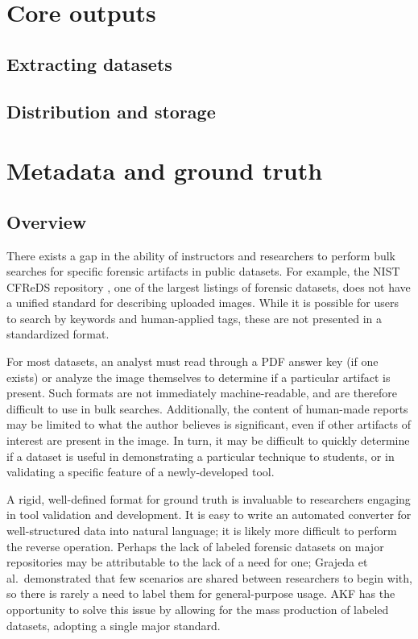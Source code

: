 \section{Core outputs}\label{core-outputs}

\subsection{Extracting datasets}\label{extracting-datasets}

\subsection{Distribution and
storage}\label{distribution-and-storage}

\section{Metadata and ground
truth}\label{metadata-and-ground-truth}

\subsection{Overview}\label{overview-1}

There exists a gap in the ability of instructors and researchers to
perform bulk searches for specific forensic artifacts in public
datasets. For example, the NIST CFReDS repository
\cite{nationalinstituteofstandardsandtechnologyCFReDSPortal}, one of
the largest listings of forensic datasets, does not have a unified
standard for describing uploaded images. While it is possible for users
to search by keywords and human-applied tags, these are not presented in
a standardized format.

For most datasets, an analyst must read through a PDF answer key (if one
exists) or analyze the image themselves to determine if a particular
artifact is present. Such formats are not immediately machine-readable,
and are therefore difficult to use in bulk searches. Additionally, the
content of human-made reports may be limited to what the author believes
is significant, even if other artifacts of interest are present in the
image. In turn, it may be difficult to quickly determine if a dataset is
useful in demonstrating a particular technique to students, or in
validating a specific feature of a newly-developed tool.

A rigid, well-defined format for ground truth is invaluable to
researchers engaging in tool validation and development. It is easy to
write an automated converter for well-structured data into natural
language; it is likely more difficult to perform the reverse operation.
Perhaps the lack of labeled forensic datasets on major repositories may
be attributable to the lack of a need for one; Grajeda et
al.~demonstrated that few scenarios are shared between researchers to
begin with, so there is rarely a need to label them for general-purpose
usage. AKF has the opportunity to solve this issue by allowing for the
mass production of labeled datasets, adopting a single major standard.


